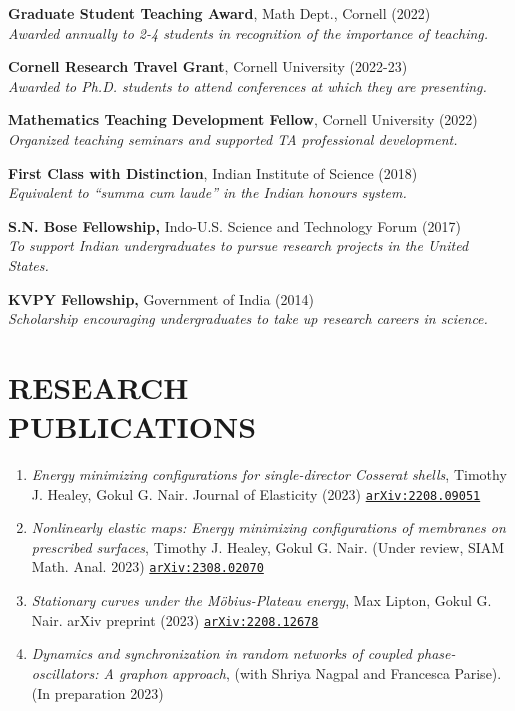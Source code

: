 \documentclass[margin]{res} %
\begin{document}
\begin{resume}
{\bf Graduate Student Teaching Award}, Math Dept., Cornell (2022)\\
\textit{Awarded annually to 2-4 students in recognition of the importance of teaching. }

{\bf Cornell Research Travel Grant}, Cornell University (2022-23)\\
\textit{Awarded to Ph.D. students to attend conferences at which they are presenting.}

{\bf Mathematics Teaching Development Fellow}, Cornell University (2022)\\
\textit{Organized teaching seminars and supported TA professional development.}

{\bf First Class with Distinction}, Indian Institute of Science (2018)\\
\textit{Equivalent to ``summa cum laude'' in the Indian honours system.}


{\bf S.N. Bose Fellowship,} Indo-U.S. Science and Technology Forum (2017)\\
\textit{To support Indian undergraduates to pursue research projects in the United States.}

{\bf KVPY Fellowship,} Government of India (2014)\\
\textit{Scholarship encouraging undergraduates to take up research careers in science.}

\section{RESEARCH\\PUBLICATIONS}
\begin{enumerate}
	\item {\sl Energy minimizing configurations for single-director Cosserat shells}, Timothy J. Healey, Gokul G. Nair. Journal of Elasticity (2023) \href{https://arxiv.org/abs/2208.09051}{\texttt{arXiv:2208.09051}}

	\item {\sl Nonlinearly elastic maps: Energy minimizing configurations of membranes on prescribed surfaces}, Timothy J. Healey, Gokul G. Nair. (Under review, SIAM Math. Anal. 2023) \href{https://arxiv.org/abs/2308.02070}{\texttt{arXiv:2308.02070}} 
	
	\item {\sl Stationary curves under the M\"obius-Plateau energy}, Max Lipton, Gokul G. Nair. arXiv preprint (2023) \href{https://arxiv.org/abs/2208.12678}{\texttt{arXiv:2208.12678}} 
	
	\item {\sl Dynamics and synchronization in random networks of coupled phase-oscillators: A graphon approach}, (with Shriya Nagpal and Francesca Parise). (In preparation 2023)
	

\end{enumerate}
\end{resume}
\end{document}
